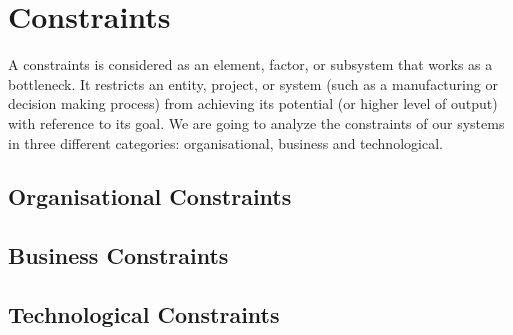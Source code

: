 \section{Constraints}

A constraints is \cite{web:bus-doc} considered as an element, factor, or subsystem that works as a bottleneck. It restricts an entity, project, or system (such as a manufacturing or decision making process) from achieving its potential (or higher level of output) with reference to its goal. We are going to analyze the constraints of our systems in three different categories: organisational, business and technological.

\subsection{Organisational Constraints}
\subsection{Business Constraints}
\subsection{Technological Constraints}

